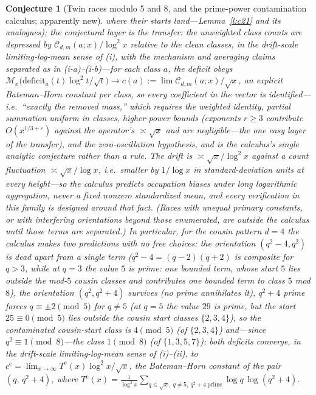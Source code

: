 \documentclass[11pt]{article}
\newtheorem{conjecture}{Conjecture}
\theoremstyle{definition}
\newcommand{\M}{\mathcal M}
\begin{document}
\begin{conjecture}[Twin races modulo 5 and 8, and the prime-power
contamination calculus; apparently new]
where their starts land---Lemma~\ref{l:c21} and its analogues); the
conjectural layer is the transfer: the unweighted class counts are
depressed by $\mathcal C_{d,m}(a;x)/\log^2x$ relative to the clean
classes, in the drift-scale limiting-log-mean sense of (i), with the
mechanism and averaging claims separated as in (i-a)--(i-b)---for
each class $a$, the deficit obeys
$\M_x\bigl(\mathrm{deficit}_a(t)\log^2t/\sqrt t\bigr)\to
c(a):=\lim\mathcal C_{d,m}(a;x)/\sqrt x$, an explicit Bateman--Horn
constant per class, so every coefficient in the vector is
identified---i.e.\ ``exactly the removed
mass,'' which requires the weighted identity, partial summation
uniform in classes, higher-power bounds (exponents $r\ge3$
contribute $O(x^{1/3+\varepsilon})$ against the operator's
$\asymp\sqrt x$ and are negligible---the one easy layer of the
transfer), and the zero-oscillation
hypothesis, and is the calculus's single analytic conjecture rather than a
rule.  The drift is
$\asymp\sqrt x/\log^2x$ against a count fluctuation
$\asymp\sqrt x/\log x$, i.e.\ smaller by $1/\log x$ in
standard-deviation units at every height---so the calculus predicts
occupation biases under long logarithmic aggregation, never a fixed
nonzero standardized mean, and every verification in this family is
designed around that fact.  (Races with unequal primary
constants, or with interfering orientations beyond those enumerated,
are outside the calculus until those terms are separated.)  In
particular,
for the cousin pattern $d=4$ the calculus makes two predictions with
no free choices: the orientation $(q^2-4,q^2)$ is dead apart from a single term ($q^2-4=(q-2)(q+2)$ is composite for $q>3$, while at $q=3$ the value $5$ is prime: one bounded term, whose start $5$ lies outside the mod-$5$ cousin classes and contributes one bounded term to class $5$ mod $8$), the orientation $(q^2,q^2+4)$
survives (no prime annihilates it), $q^2+4$ prime forces
$q\equiv\pm2\pmod5$ for $q\neq5$ (at $q=5$ the value $29$ is prime,
but the start $25\equiv0\pmod5$ lies outside the cousin start classes
$\{2,3,4\}$), so the contaminated cousin-start class is
$4\pmod 5$ (of $\{2,3,4\}$) and---since $q^2\equiv1\pmod8$---the
class $1\pmod 8$ (of $\{1,3,5,7\}$): both deficits converge, in the
drift-scale limiting-log-mean sense of (i)--(ii), to
$c^{\mathrm c}=\lim_{x\to\infty}T^{\mathrm c}(x)\log^2x/\sqrt x$,
the Bateman--Horn constant of the pair $(q,\,q^2+4)$, where
$T^{\mathrm c}(x)=\frac1{\log^2x}\sum_{q\le\sqrt x,\ q\neq5,\ q^2+4\
\mathrm{prime}}\log q\,\log(q^2+4)$.
\end{conjecture}
\end{document}
